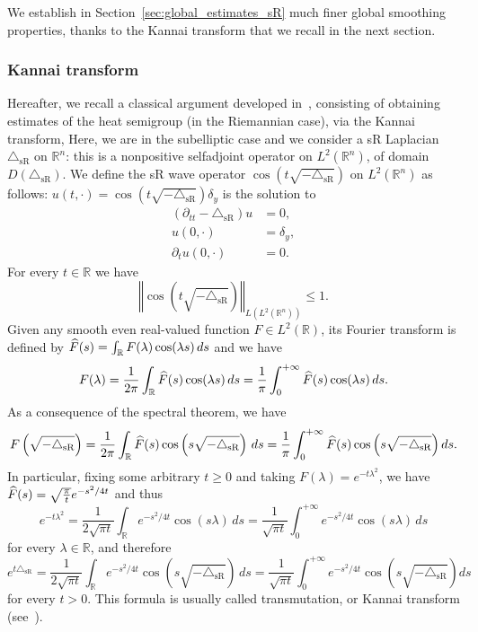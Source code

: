 \documentclass[10pt]{amsart}
\theoremstyle{definition}\newtheorem{defi}[theo]{Definition}\newtheorem{rema}[theo]{Remark}\newtheorem{exam}[theo]{Example}\newtheorem{exem}[theo]{Example}\newtheorem{nota}[theo]{Notation}
\newcommand*\R{\mathbb{R}}
\newcommand{\trianglesR}{\triangle_{\mathrm{sR}}}
\renewcommand{\geq}{\geqslant}
\renewcommand{\leq}{\leqslant}
\let\oldhat\hat
\renewcommand*{\hat}[1]{\mathchoice{\widehat{#1}}{\widehat{#1}}{\oldhat{#1}}{\oldhat{#1}}}
\begin{document}
We establish in Section~\ref{sec:global_estimates_sR} much finer global smoothing properties, thanks to the Kannai transform that we recall in the next section.


\subsubsection{Kannai transform}
Hereafter, we recall a classical argument developed in~\cite{CheegerGromovTaylor_1982}, consisting of obtaining estimates of the heat semigroup (in the Riemannian case), via the Kannai transform, Here, we are in the subelliptic case and we consider a sR Laplacian $\trianglesR$ on $\R^n$: this is a nonpositive selfadjoint operator on $L^2(\R^n)$, of domain $D(\trianglesR)$. We define the sR wave operator $\cos(t\sqrt{-\trianglesR})$ on $L^2(\R^n)$ as follows: $u(t,\cdot)=\cos\left(t\sqrt{-\trianglesR}\right)\delta_y$ is the solution to
\begin{align*}
(\partial_{tt}-\trianglesR)u&=0, \\
u(0,\cdot)&=\delta_y,\\
\partial_t u(0,\cdot)&=0.
\end{align*}
For every $t\in\R$ we have
\begin{equation}\label{cosinf1}
\left\Vert \cos\left(t\sqrt{-\trianglesR}\right)\right\Vert_{L\left(L^2\left(\R^n\right)\right)}\leq 1.
\end{equation}
Given any smooth even real-valued function $F\in L^2(\R)$, its Fourier transform is defined by $\hat F(s) = \int_\R F(\lambda) \cos(\lambda s)\, ds$ and we have
\[
F(\lambda) = \frac{1}{2\pi}\int_\R \hat F(s) \cos(\lambda s)\, ds = \frac{1}{\pi}\int_0^{+\infty} \hat F(s) \cos(\lambda s)\, ds.
\]
As a consequence of the spectral theorem, we have
\[
F\left(\sqrt{-\trianglesR}\right) = \frac{1}{2\pi}\int_\R \hat F(s) \cos\left(s\sqrt{-\trianglesR}\right)\, ds = \frac{1}{\pi}\int_0^{+\infty} \hat F(s) \cos\left(s\sqrt{-\trianglesR}\right) ds.
\]
In particular, fixing some arbitrary $t\geq 0$ and taking $F(\lambda)=e^{-t\lambda^2}$, we have $\hat F(s)\linebreak= \sqrt{\frac{\pi}{t}} e^{-s^2/4t}$ and thus
\[
e^{-t\lambda^2} = \frac{1}{2\sqrt{\pi t}} \int_\R e^{-s^2/4t} \cos(s\lambda)\, ds = \frac{1}{\sqrt{\pi t}} \int_0^{+\infty} e^{-s^2/4t} \cos(s\lambda)\, ds
\]
for every $\lambda\in\R$, and therefore
\[
e^{t\trianglesR} = \frac{1}{2\sqrt{\pi t}} \int_\R e^{-s^2/4t} \cos\left(s\sqrt{-\trianglesR}\right)\, ds = \frac{1}{\sqrt{\pi t}} \int_0^{+\infty} e^{-s^2/4t} \cos\left(s\sqrt{-\trianglesR}\right) ds
\]
for every $t>0$. This formula is usually called transmutation, or Kannai transform (see~\cite{Kannai}).
\end{document}
